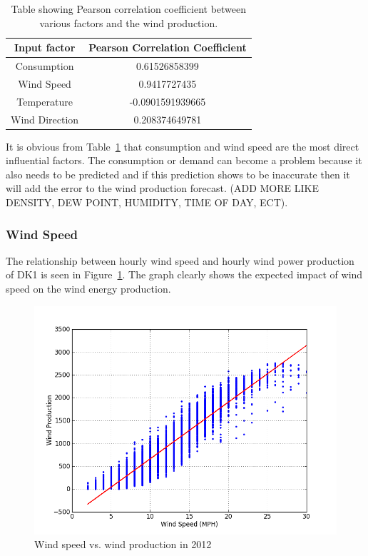 \begin{table}[H]
\centering  %
\begin{tabular}{c c} %
Input factor & Pearson Correlation Coefficient \\ [0.5ex] %
\hline                  %
Consumption & 0.61526858399 \\ %
Wind Speed & 0.9417727435 \\
Temperature & -0.0901591939665 \\
Wind Direction & 0.208374649781 \\ [1ex] %
\hline %
\end{tabular}
\caption{Table showing Pearson correlation coefficient between various factors and the wind production.} %
\label{table:pearsonCoeficientWindProduction} %
\end{table}

It is obvious from Table~\ref{table:pearsonCoeficientWindProduction} that consumption and wind speed are the most direct influential factors. The consumption or demand can become a problem because it also needs to be predicted and if this prediction shows to be inaccurate then it will add the error to the wind production forecast.  (ADD MORE LIKE DENSITY, DEW POINT, HUMIDITY, TIME OF DAY, ECT).

\subsubsection{Wind Speed}
The relationship between hourly wind speed and hourly wind power production of DK1 is seen in Figure~\ref{fig:windVsProd}. The graph clearly shows the expected impact of wind speed on the wind energy production.

\begin{figure}[H]
\centering
\includegraphics[width=0.99\linewidth,natwidth=898,natheight=587]{billeder/WindSpeedVsProduction.png}
\caption{Wind speed vs. wind production in 2012}
\label{fig:windVsProd}
\end{figure}


